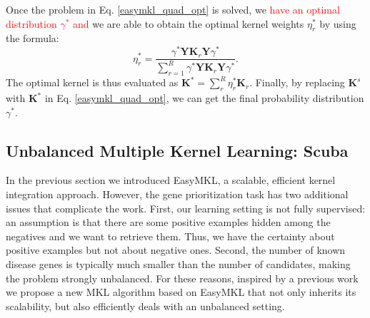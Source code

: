 \documentclass[twocolumn]{bmcart}%
\begin{document}
Once the problem in Eq. \ref{easymkl_quad_opt} is solved, we \textcolor{red}{have an optimal distribution $\gamma^{*}$ and} we are able to obtain the optimal kernel weights $\eta_r^*$ by using the formula:
\begin{equation}\label{eta}
	\eta_r^* = \frac{\gamma^* \textbf{Y} \textbf{K}_r \textbf{Y} \gamma^*}{\sum_{r=1}^R \gamma^* \textbf{Y} \textbf{K}_r \textbf{Y} \gamma^*}.
\end{equation}
The optimal kernel is thus evaluated as $ \textbf{K}^{*} = \sum_{r}^R \eta_r^* \textbf{K}_r$. Finally, by replacing $\textbf{K}^{s}$ with $\textbf{K}^{*}$ in Eq. \ref{easymkl_quad_opt}, we can get the final probability distribution $\gamma^{*}$.

\subsection*{Unbalanced Multiple Kernel Learning: Scuba}
In the previous section we introduced EasyMKL, a scalable, efficient kernel integration approach. However, the gene prioritization task has two additional issues that complicate the work. First, our learning setting is not fully supervised: an assumption is that there are some positive examples hidden among the negatives and we want to retrieve them. Thus, we have the certainty about positive examples but not about negative ones. Second, the number of known disease genes is typically much smaller than the number of candidates, making the problem strongly unbalanced. For these reasons, inspired by a previous work \cite{pyros} we propose a new MKL algorithm based on EasyMKL that not only inherits its scalability, but also efficiently deals with an unbalanced setting.
\end{document}
